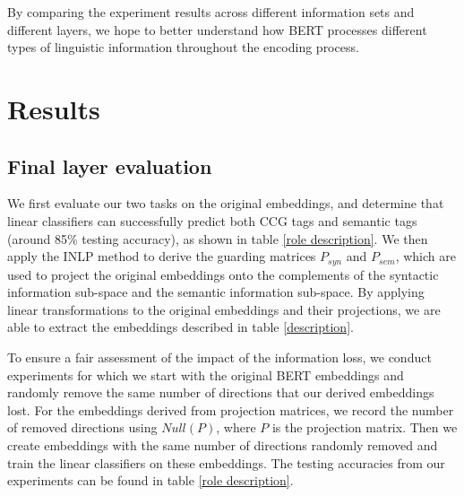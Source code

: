 \documentclass[11pt,a4paper]{article}
\begin{document}
By comparing the experiment results across different information sets and different layers, we hope to better understand how BERT processes different types of linguistic information throughout the encoding process.





\section{Results}
\label{sec:result}
\subsection{Final layer evaluation}
We first evaluate our two tasks on the original embeddings, and determine that linear classifiers can successfully predict both CCG tags and semantic tags (around 85\% testing accuracy), as shown in table \ref{role description}. We then apply the INLP method to derive the guarding matrices $P_{syn}$ and $P_{sem}$, which are used to project the original embeddings onto the complements of the syntactic information sub-space and the semantic information sub-space. By applying linear transformations to the original embeddings and their projections, we are able to extract the embeddings described in table \ref{description}. 

To ensure a fair assessment of the impact of the information loss, we conduct experiments for which we start with the original BERT embeddings and randomly remove the same number of directions that our derived embeddings lost. For the embeddings derived from projection matrices, we record the number of removed directions using $Null(P)$, where $P$ is the projection matrix. 
Then we create embeddings with the same number of directions randomly removed and train the linear classifiers on these embeddings. The testing accuracies from our experiments can be found in table \ref{role description}.
\end{document}

